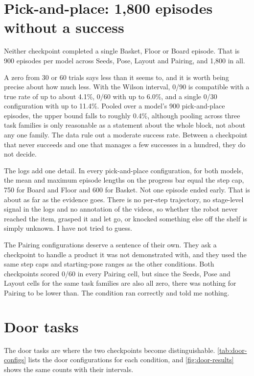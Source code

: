 \section{Pick-and-place: 1,800 episodes without a success}
\label{sec:pick-zero}

Neither checkpoint completed a single Basket, Floor or Board episode. That is 900 episodes per model across Seeds, Pose, Layout and Pairing, and 1,800 in all.

A zero from 30 or 60 trials says less than it seems to, and it is worth being precise about how much less. With the Wilson interval, 0/90 is compatible with a true rate of up to about 4.1\%, 0/60 with up to 6.0\%, and a single 0/30 configuration with up to 11.4\%. Pooled over a model's 900 pick-and-place episodes, the upper bound falls to roughly 0.4\%, although pooling across three task families is only reasonable as a statement about the whole block, not about any one family. The data rule out a moderate success rate. Between a checkpoint that never succeeds and one that manages a few successes in a hundred, they do not decide.

The logs add one detail. In every pick-and-place configuration, for both models, the mean and maximum episode lengths on the progress bar equal the step cap, 750 for Board and Floor and 600 for Basket. Not one episode ended early. That is about as far as the evidence goes. There is no per-step trajectory, no stage-level signal in the logs and no annotation of the videos, so whether the robot never reached the item, grasped it and let go, or knocked something else off the shelf is simply unknown. I have not tried to guess.

The Pairing configurations deserve a sentence of their own. They ask a checkpoint to handle a product it was not demonstrated with, and they used the same step caps and starting-pose ranges as the other conditions. Both checkpoints scored 0/60 in every Pairing cell, but since the Seeds, Pose and Layout cells for the same task families are also all zero, there was nothing for Pairing to be lower than. The condition ran correctly and told me nothing.

\section{Door tasks}
\label{sec:doors}

The door tasks are where the two checkpoints become distinguishable. \ref{tab:door-configs} lists the door configurations for each condition, and \ref{fig:door-results} shows the same counts with their intervals.

